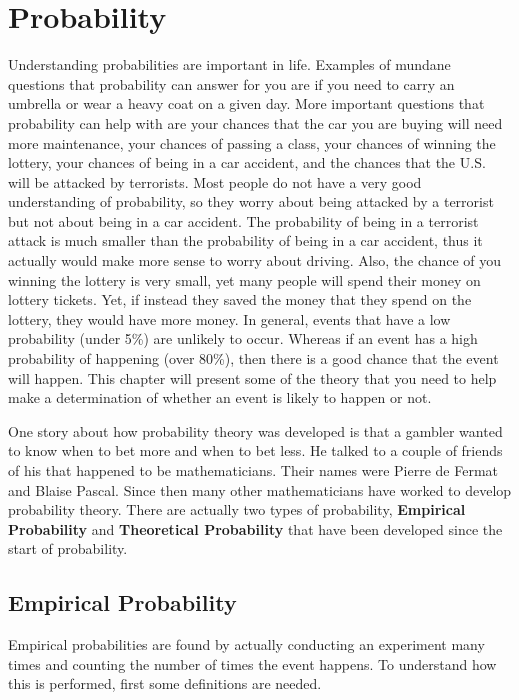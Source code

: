 \documentclass[
]{book}
\begin{document}
\hypertarget{probability}{%
\chapter{Probability}\label{probability}}

Understanding probabilities are important in life. Examples of mundane questions that probability can answer for you are if you need to carry an umbrella or wear a heavy coat on a given day. More important questions that probability can help with are your chances that the car you are buying will need more maintenance, your chances of passing a class, your chances of winning the lottery, your chances of being in a car accident, and the chances that the U.S. will be attacked by terrorists. Most people do not have a very good understanding of probability, so they worry about being attacked by a terrorist but not about being in a car accident. The probability of being in a terrorist attack is much smaller than the probability of being in a car accident, thus it actually would make more sense to worry about driving. Also, the chance of you winning the lottery is very small, yet many people will spend their money on lottery tickets. Yet, if instead they saved the money that they spend on the lottery, they would have more money. In general, events that have a low probability (under 5\%) are unlikely to occur. Whereas if an event has a high probability of happening (over 80\%), then there is a good chance that the event will happen. This chapter will present some of the theory that you need to help make a determination of whether an event is likely to happen or not.

One story about how probability theory was developed is that a gambler wanted to know when to bet more and when to bet less. He talked to a couple of friends of his that happened to be mathematicians. Their names were Pierre de Fermat and Blaise Pascal. Since then many other mathematicians have worked to develop probability theory. There are actually two types of probability, \textbf{Empirical Probability} and \textbf{Theoretical Probability} that have been developed since the start of probability.

\hypertarget{empirical-probability}{%
\section{Empirical Probability}\label{empirical-probability}}

Empirical probabilities are found by actually conducting an experiment many times and counting the number of times the event happens. To understand how this is performed, first some definitions are needed.
\end{document}
